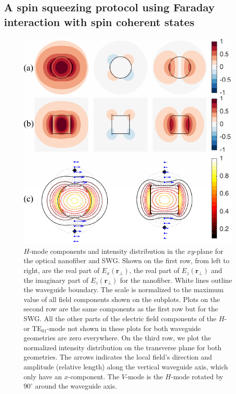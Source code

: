 \documentclass[preprint,aps,pra,onecolumn,superscriptaddress]{revtex4-1} %
\def\br{\mathbf{r}}
\begin{document}
\subsection{A spin squeezing protocol using Faraday interaction with spin coherent states}

\begin{figure}[htb]
\centering
  \includegraphics[width=.69\textwidth]{fig/nanofiberswg_Hmode6} 
  \caption{$H$-mode components and intensity distribution in the $ xy $-plane for the optical nanofiber and SWG. Shown on the first row, from left to right, are the real part of $ E_x(\br\!_\perp) $, the real part of $ E_z(\br\!_\perp) $ and the imaginary part of $ E_z(\br\!_\perp) $ for the nanofiber. White lines outline the waveguide boundary. The scale is normalized to the maximum value of all field components shown on the subplots. Plots on the second row are the same components as the first row but for the SWG. All the other parts of the electric field components of the $ H $- or TE$_{01}$-mode not shown in these plots for both waveguide geometries are zero everywhere. On the third row, we plot the normalized intensity distribution on the transverse plane for both geometries. The arrows indicates the local field's direction and amplitude (relative length) along the vertical waveguide axis, which only have an $ x $-component. The $ V $-mode is the $ H $-mode rotated by $ 90^\circ $ around the waveguide axis. }\label{fig:nanofiberswg_E_ints}
\end{figure}
\end{document}
